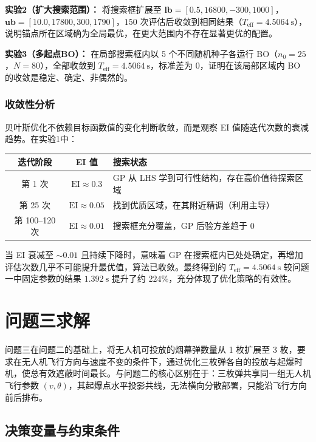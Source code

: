 \documentclass{ctexart}
\begin{document}
\textbf{实验2（扩大搜索范围）：} 将搜索框扩展至 $\mathbf{lb}=[0.5,16800,-300,1000]$，$\mathbf{ub}=[10.0,17800,300,1790]$，$150$ 次评估后收敛到相同结果（$T_{\text{eff}}=4.5064\ \mathrm{s}$），说明锚点所在区域确为全局最优，在更大范围内不存在显著更优的配置。

\textbf{实验3（多起点BO）：} 在局部搜索框内以 5 个不同随机种子各运行 BO（$n_0=25$，$N=80$），全部收敛到 $T_{\text{eff}} = 4.5064\ \mathrm{s}$，标准差为 $0$，证明在该局部区域内 BO 的收敛是稳定、确定、非偶然的。

\subsubsection{收敛性分析}

贝叶斯优化不依赖目标函数值的变化判断收敛，而是观察 EI 值随迭代次数的衰减趋势。在实验1中：

\begin{center}
\begin{tabular}{c|c|p{5.5cm}}
\toprule
\textbf{迭代阶段} & \textbf{EI 值} & \textbf{搜索状态} \\
\midrule
第 1 次    & $\mathrm{EI} \approx 0.3$   & GP 从 LHS 学到可行性结构，存在高价值待探索区域 \\
第 25 次   & $\mathrm{EI} \approx 0.05$  & 找到优质区域，在其附近精调（利用主导） \\
第 100--120 次 & $\mathrm{EI} \approx 0.01$  & 搜索框充分覆盖，GP 后验方差趋于 0 \\
\bottomrule
\end{tabular}
\end{center}

当 EI 衰减至 $\sim 0.01$ 且持续下降时，意味着 GP 在搜索框内已处处确定，再增加评估次数几乎不可能提升最优值，算法已收敛。最终得到的 $T_{\text{eff}}=4.5064\ \mathrm{s}$ 较问题一中固定参数的结果 $1.392\ \mathrm{s}$ 提升了约 $224\%$，充分体现了优化策略的有效性。
\section{问题三求解}

问题三在问题二的基础上，将无人机可投放的烟幕弹数量从 1 枚扩展至 3 枚，要求在无人机飞行方向与速度不变的条件下，通过优化三枚弹各自的投放与起爆时机，使总有效遮蔽时间最长。与问题二的核心区别在于：三枚弹共享同一组无人机飞行参数 $(v,\theta)$，其起爆点水平投影共线，无法横向分散部署，只能沿飞行方向前后排布。

\subsection{决策变量与约束条件}
\end{document}
